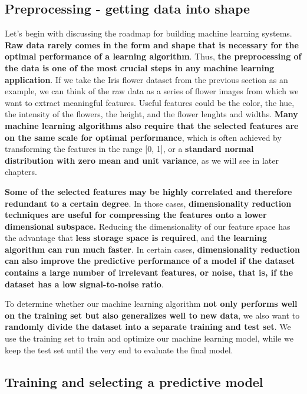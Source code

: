 \documentclass[11pt]{article}
\begin{document}
    

    \subsection{Preprocessing - getting data into
shape}\label{preprocessing---getting-data-into-shape}

    Let's begin with discussing the roadmap for building machine learning
systems. \textbf{Raw data rarely comes in the form and shape that is
necessary for the optimal performance of a learning algorithm}. Thus,
\textbf{the preprocessing of the data is one of the most crucial steps
in any machine learning application}. If we take the Iris flower dataset
from the previous section as an example, we can think of the raw data as
a series of flower images from which we want to extract meaningful
features. Useful features could be the color, the hue, the intensity of
the flowers, the height, and the flower lenghts and widths. \textbf{Many
machine learning algorithms also require that the selected features are
on the same scale for optimal performance}, which is often achieved by
transforming the features in the range {[}0, 1{]}, or a \textbf{standard
normal distribution with zero mean and unit variance}, as we will see in
later chapters.

    \textbf{Some of the selected features may be highly correlated and
therefore redundant to a certain degree}. In those cases,
\textbf{dimensionality reduction techniques are useful for compressing
the features onto a lower dimensional subspace.} Reducing the
dimensionality of our feature space has the advantage that \textbf{less
storage space is required}, and \textbf{the learning algorithm can run
much faster}. In certain cases, \textbf{dimensionality reduction can
also improve the predictive performance of a model if the dataset
contains a large number of irrelevant features, or noise, that is, if
the dataset has a low signal-to-noise ratio}.

    To determine whether our machine learning algorithm \textbf{not only
performs well on the training set but also generalizes well to new
data}, we also want to \textbf{randomly divide the dataset into a
separate training and test set}. We use the training set to train and
optimize our machine learning model, while we keep the test set until
the very end to evaluate the final model.

    \subsection{Training and selecting a predictive
model}\label{training-and-selecting-a-predictive-model}
\end{document}
